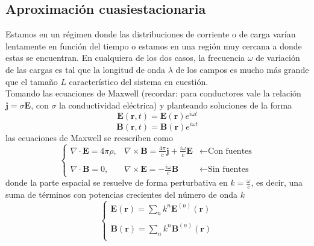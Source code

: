 \subsection{Aproximación cuasiestacionaria}
Estamos en un régimen donde las distribuciones de corriente o de carga varían lentamente en función del tiempo o estamos en una región muy cercana a donde estas se encuentran. En cualquiera de los dos casos, la frecuencia $\omega$ de variación de las cargas es tal que la longitud de onda $\lambda$ de los campos es mucho más grande que el tamaño $L$ característico del sistema en cuestión.\\
\indent Tomando las ecuaciones de Maxwell (recordar: para conductores vale la relación $\textbf{j} = \sigma \textbf{E}$, con $\sigma$ la conductividad eléctrica) y planteando soluciones de la forma
\begin{equation*}
    \textbf{E}(\textbf{r},t) = \textbf{E}(\textbf{r})e^{i\omega t}
\end{equation*}
\begin{equation*}
    \textbf{B}(\textbf{r},t) = \textbf{B}(\textbf{r})e^{i\omega t}
\end{equation*}
las ecuaciones de Maxwell se reescriben como
\begin{equation*}
    \left\{
        \begin{matrix}
            \nabla \cdot \textbf{E} = 4\pi\rho,
            &
            \nabla \times \textbf{B} = 
            \frac{4\pi}{c}\textbf{j}
            + \frac{i\omega}{c}\textbf{E}
            &
            \longleftarrow
            \mbox{Con fuentes}\\
            & & \\
            \nabla \cdot \textbf{B} = 0,
            &
            \nabla \times \textbf{E} =
            -\frac{i\omega}{c}\textbf{B}
            &
            \longleftarrow \mbox{Sin fuentes}
        \end{matrix}
    \right.
\end{equation*}
donde la parte espacial se resuelve de forma perturbativa en $k = \frac{\omega}{c}$, es decir, una suma de términos con potencias crecientes del número de onda $k$
\begin{equation*}
    \left\{
        \begin{matrix}
            \textbf{E}(\textbf{r}) = \sum\limits_{n}k^{n}\textbf{E}^{(n)}(\textbf{r})\\
            \\
            \textbf{B}(\textbf{r}) = \sum\limits_{n}k^{n}\textbf{B}^{(n)}(\textbf{r})\\
        \end{matrix}
    \right.
\end{equation*}
